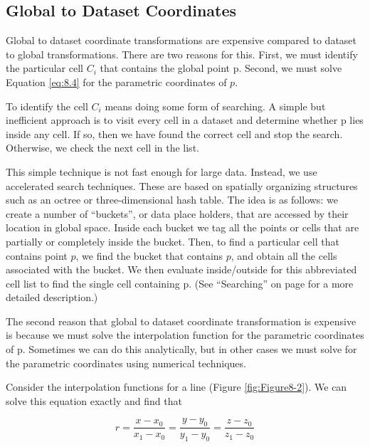 \subsection{Global to Dataset Coordinates}

Global to dataset coordinate transformations are expensive compared to dataset to global transformations. There are two reasons for this. First, we must identify the particular cell $C_i$ that contains the global point p. Second, we must solve Equation \ref{eq:8.4} for the parametric coordinates of $p$.

To identify the cell $C_i$ means doing some form of searching. A simple but inefficient approach is to visit every cell in a dataset and determine whether p lies inside any cell. If so, then we have found the correct cell and stop the search. Otherwise, we check the next cell in the list.

This simple technique is not fast enough for large data. Instead, we use accelerated search techniques. These are based on spatially organizing structures such as an octree or three-dimensional hash table. The idea is as follows: we create a number of ``buckets'', or data place holders, that are accessed by their location in global space. Inside each bucket we tag all the points or cells that are partially or completely inside the bucket. Then, to find a particular cell that contains point $p$, we find the bucket that contains $p$, and obtain all the cells associated with the bucket. We then evaluate inside/outside for this abbreviated cell list to find the single cell containing p. (See ``Searching'' on page \pageref{sec:searching} for a more detailed description.)

The second reason that global to dataset coordinate transformation is expensive is because we must solve the interpolation function for the parametric coordinates of p. Sometimes we can do this analytically, but in other cases we must solve for the parametric coordinates using numerical techniques.

Consider the interpolation functions for a line (Figure \ref{fig:Figure8-2}). We can solve this equation exactly and find that

\begin{equation}\label{eq:8.9}
r = \frac{x - x_0}{x_1 - x_0} = \frac{y - y_0}{y_1 - y_0} = \frac{z - z_0}{z_1 - z_0}
\end{equation}


